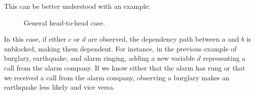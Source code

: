 This can be better understood with an example:
\begin{figure}[H]
    \centering
    \caption{General head-to-head case.}
\end{figure}
In this case, if either $c$ or $d$ are observed, the dependency path between $a$ and $b$ is unblocked, making them dependent.
For instance, in the previous example of burglary, earthquake, and alarm ringing, adding a new variable $d$ representing a call from the alarm company.
If we know either that the alarm has rung or that we received a call from the alarm company,
observing a burglary makes an earthquake less likely and vice versa.

